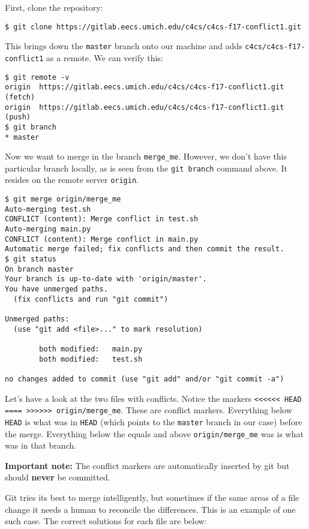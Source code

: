 \documentclass{article}
\begin{document}
{\color{violet}
    First, clone the repository:
    \begin{verbatim}
$ git clone https://gitlab.eecs.umich.edu/c4cs/c4cs-f17-conflict1.git
    \end{verbatim}

    This brings down the \texttt{master} branch onto our machine and adds
    \texttt{c4cs/c4cs-f17-conflict1} as a remote. We can verify this:

    \begin{verbatim}
$ git remote -v
origin  https://gitlab.eecs.umich.edu/c4cs/c4cs-f17-conflict1.git (fetch)
origin  https://gitlab.eecs.umich.edu/c4cs/c4cs-f17-conflict1.git (push)
$ git branch
* master
    \end{verbatim}

    Now we want to merge in the branch \texttt{merge\_me}. However, we don't
    have this particular branch locally, as is seen from the \texttt{git branch}
    command above. It resides on the remote server \texttt{origin}.

    \begin{verbatim}
$ git merge origin/merge_me
Auto-merging test.sh
CONFLICT (content): Merge conflict in test.sh
Auto-merging main.py
CONFLICT (content): Merge conflict in main.py
Automatic merge failed; fix conflicts and then commit the result.
$ git status
On branch master
Your branch is up-to-date with 'origin/master'.
You have unmerged paths.
  (fix conflicts and run "git commit")

Unmerged paths:
  (use "git add <file>..." to mark resolution)

        both modified:   main.py
        both modified:   test.sh

no changes added to commit (use "git add" and/or "git commit -a")
    \end{verbatim}

    \newpage

    Let's have a look at the two files with conflicts. Notice the markers
    \texttt{<<<<<< HEAD ==== >>>>>> origin/merge\_me}. These are conflict
    markers. Everything below \texttt{HEAD} is what was in \texttt{HEAD} (which
    points to the \texttt{master} branch in our case) before the merge.
    Everything below the equals and above \texttt{origin/merge\_me} was is what
    was in that branch.
    
    \textbf{Important note:} The conflict markers are automatically inserted by
    git but should \textbf{never} be committed.

    Git tries its best to merge intelligently, but sometimes if the same areas
    of a file change it needs a human to reconcile the differences. This is an
    example of one such case. The correct solutions for each file are below:

}
\end{document}
